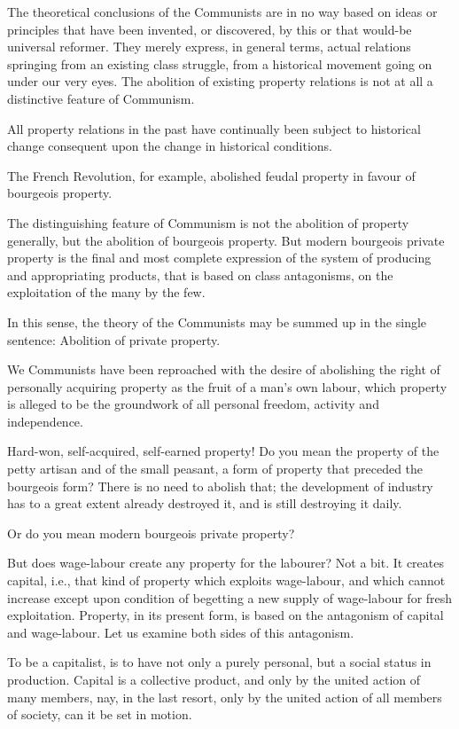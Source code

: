 \documentclass[, oneside]{article}   	%
\begin{document}
The theoretical conclusions of the Communists are in no way based on ideas or principles that have been invented, or discovered, by this or that would-be universal reformer. They merely express, in general terms, actual relations springing from an existing class struggle, from a historical movement going on under our very eyes. The abolition of existing property relations is not at all a distinctive feature of Communism.

All property relations in the past have continually been subject to historical change consequent upon the change in historical conditions.

The French Revolution, for example, abolished feudal property in favour of bourgeois property.

The distinguishing feature of Communism is not the abolition of property generally, but the abolition of bourgeois property. But modern bourgeois private property is the final and most complete expression of the system of producing and appropriating products, that is based on class antagonisms, on the exploitation of the many by the few.

In this sense, the theory of the Communists may be summed up in the single sentence: Abolition of private property.

We Communists have been reproached with the desire of abolishing the right of personally acquiring property as the fruit of a man's own labour, which property is alleged to be the groundwork of all personal freedom, activity and independence.

Hard-won, self-acquired, self-earned property! Do you mean the property of the petty artisan and of the small peasant, a form of property that preceded the bourgeois form? There is no need to abolish that; the development of industry has to a great extent already destroyed it, and is still destroying it daily.

Or do you mean modern bourgeois private property?

But does wage-labour create any property for the labourer? Not a bit. It creates capital, i.e., that kind of property which exploits wage-labour, and which cannot increase except upon condition of begetting a new supply of wage-labour for fresh exploitation. Property, in its present form, is based on the antagonism of capital and wage-labour. Let us examine both sides of this antagonism.

To be a capitalist, is to have not only a purely personal, but a social status in production. Capital is a collective product, and only by the united action of many members, nay, in the last resort, only by the united action of all members of society, can it be set in motion.
\end{document}
